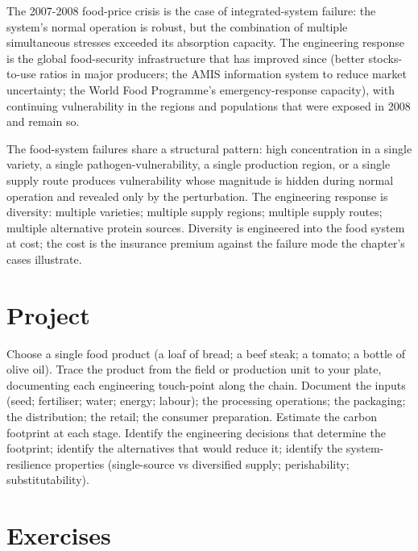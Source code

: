 The 2007-2008 food-price crisis \cite{paper:headey-fan-2008} is the case of integrated-system failure: the system's normal operation is robust, but the combination of multiple simultaneous stresses exceeded its absorption capacity. The engineering response is the global food-security infrastructure that has improved since (better stocks-to-use ratios in major producers; the AMIS information system to reduce market uncertainty; the World Food Programme's emergency-response capacity), with continuing vulnerability in the regions and populations that were exposed in 2008 and remain so.

\begin{principle}
The food-system failures share a structural pattern: high concentration in a single variety, a single pathogen-vulnerability, a single production region, or a single supply route produces vulnerability whose magnitude is hidden during normal operation and revealed only by the perturbation. The engineering response is diversity: multiple varieties; multiple supply regions; multiple supply routes; multiple alternative protein sources. Diversity is engineered into the food system at cost; the cost is the insurance premium against the failure mode the chapter's cases illustrate.
\end{principle}

\section{Project}

\begin{project}
Choose a single food product (a loaf of bread; a beef steak; a tomato; a bottle of olive oil). Trace the product from the field or production unit to your plate, documenting each engineering touch-point along the chain. Document the inputs (seed; fertiliser; water; energy; labour); the processing operations; the packaging; the distribution; the retail; the consumer preparation. Estimate the carbon footprint at each stage. Identify the engineering decisions that determine the footprint; identify the alternatives that would reduce it; identify the system-resilience properties (single-source vs diversified supply; perishability; substitutability).
\end{project}

\section{Exercises}


